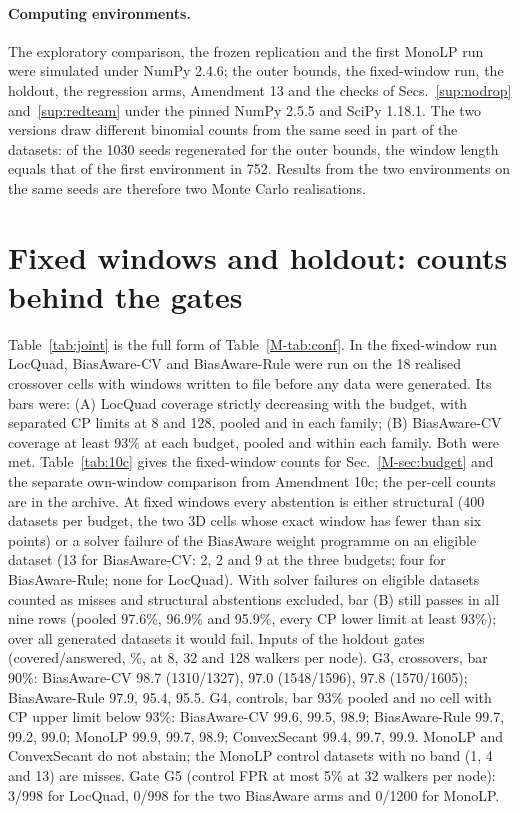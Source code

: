 \documentclass[aps,pre,twocolumn,superscriptaddress,nofootinbib,10pt]{revtex4-2}
\newcommand{\nm}[1]{\textsf{#1}}
\newcommand{\LQ}{\nm{LocQuad}}
\newcommand{\BAC}{\nm{BiasAware-CV}}
\newcommand{\BAR}{\nm{BiasAware-Rule}}
\begin{document}
\paragraph*{Computing environments.}\label{sup:env}
The exploratory comparison, the frozen replication and the first \textsf{MonoLP} run were simulated under NumPy 2.4.6; the outer bounds, the fixed-window run, the holdout, the regression arms, Amendment 13 and the checks of Secs.~\ref{sup:nodrop} and~\ref{sup:redteam} under the pinned NumPy 2.5.5 and SciPy 1.18.1. The two versions draw different binomial counts from the same seed in part of the datasets: of the 1030 seeds regenerated for the outer bounds, the window length equals that of the first environment in 752. Results from the two environments on the same seeds are therefore two Monte Carlo realisations.

\section{Fixed windows and holdout: counts behind the gates}\label{sup:10c}
Table~\ref{tab:joint} is the full form of Table~\ref{M-tab:conf}. In the fixed-window run \LQ{}, \BAC{} and \BAR{} were run on the 18 realised crossover cells with windows written to file before any data were generated. Its bars were: (A) \LQ{} coverage strictly decreasing with the budget, with separated CP limits at 8 and 128, pooled and in each family; (B) \BAC{} coverage at least 93\% at each budget, pooled and within each family. Both were met. Table~\ref{tab:10c} gives the fixed-window counts for Sec.~\ref{M-sec:budget} and the separate own-window comparison from Amendment 10c; the per-cell counts are in the archive. At fixed windows every abstention is either structural (400 datasets per budget, the two 3D cells whose exact window has fewer than six points) or a solver failure of the \textsf{BiasAware} weight programme on an eligible dataset (13 for \textsf{BiasAware-CV}: 2, 2 and 9 at the three budgets; four for \textsf{BiasAware-Rule}; none for \textsf{LocQuad}). With solver failures on eligible datasets counted as misses and structural abstentions excluded, bar (B) still passes in all nine rows (pooled 97.6\%, 96.9\% and 95.9\%, every CP lower limit at least 93\%); over all generated datasets it would fail. Inputs of the holdout gates (covered/answered, \%, at 8, 32 and 128 walkers per node). G3, crossovers, bar 90\%: \textsf{BiasAware-CV} 98.7 (1310/1327), 97.0 (1548/1596), 97.8 (1570/1605); \textsf{BiasAware-Rule} 97.9, 95.4, 95.5. G4, controls, bar 93\% pooled and no cell with CP upper limit below 93\%: \textsf{BiasAware-CV} 99.6, 99.5, 98.9; \textsf{BiasAware-Rule} 99.7, 99.2, 99.0; \textsf{MonoLP} 99.9, 99.7, 98.9; \textsf{ConvexSecant} 99.4, 99.7, 99.9. \textsf{MonoLP} and \textsf{ConvexSecant} do not abstain; the \textsf{MonoLP} control datasets with no band (1, 4 and 13) are misses. Gate G5 (control FPR at most 5\% at 32 walkers per node): 3/998 for \textsf{LocQuad}, 0/998 for the two \textsf{BiasAware} arms and 0/1200 for \textsf{MonoLP}.
\end{document}
